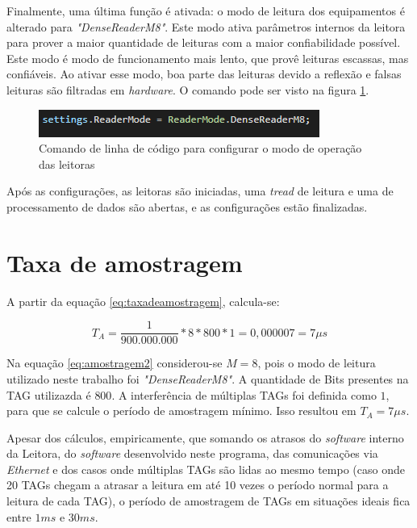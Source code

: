   Finalmente, uma última função é ativada: o modo de leitura dos equipamentos é alterado para \textit{"DenseReaderM8"}. Este modo ativa parâmetros internos da leitora para prover a maior quantidade de leituras com a maior confiabilidade possível. Este modo é modo de funcionamento mais lento, que provê leituras escassas, mas confiáveis. Ao ativar esse modo, boa parte das leituras devido a reflexão e falsas leituras são filtradas em \textit{hardware}. O comando pode ser visto na figura \ref{fig:readermode_settings}.

 \begin{figure}[H]
    \centering
    \includegraphics[width=0.6\linewidth]{figs/Metodologia/readermode_settings.PNG}
    \caption{Comando de linha de código para configurar o modo de operação das leitoras}
    \label{fig:readermode_settings}
\end{figure}

  Após as configurações, as leitoras são iniciadas, uma \textit{tread} de leitura e uma de processamento de dados são abertas, e as configurações estão finalizadas.

\section{Taxa de amostragem} \label{section:amostragem}

A partir da equação \ref{eq:taxadeamostragem}, calcula-se:

\begin{equation}
    T_A = \frac{1}{900.000.000}*8*800*1 = 0,000007 = 7\mu s
    \label{eq:amostragem2}
\end{equation}

Na equação \ref{eq:amostragem2} considerou-se $M=8$, pois o modo de leitura utilizado neste trabalho foi \textit{"DenseReaderM8"}. A quantidade de Bits presentes na TAG utilizazda é $800$. A interferência de múltiplas TAGs foi definida como $1$, para que se calcule o período de amostragem mínimo. Isso resultou em $T_A = 7 \mu s$.

Apesar dos cálculos, empiricamente, que somando os atrasos do \textit{software} interno da Leitora, do \textit{software} desenvolvido neste programa, das comunicações via \textit{Ethernet} e dos casos onde múltiplas TAGs são lidas ao mesmo tempo (caso onde 20 TAGs chegam a atrasar a leitura em até 10 vezes o período normal para a leitura de cada TAG), o período de amostragem de TAGs em situações ideais fica entre $1 ms$ e $30 ms$.

